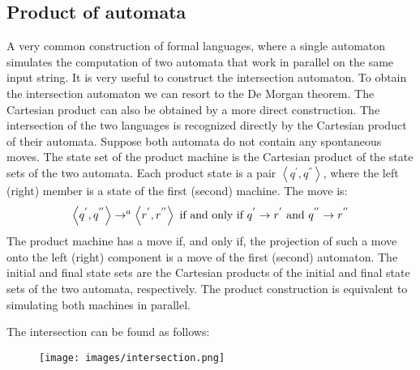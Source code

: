 \subsection*{Product of automata}
A very common construction of formal languages, where a single automaton simulates the computation of two automata that work in parallel on the same input string. 
It is very useful to construct the intersection automaton. To obtain the intersection automaton we can resort to the De Morgan theorem. The Cartesian product can 
also be obtained by a more direct construction. The intersection of the two languages is recognized directly by the Cartesian product of their automata. 
Suppose both automata do not contain any spontaneous moves. The state set of the product machine is the Cartesian product of the state sets
of the two automata. Each product state is a pair $\left\langle q^{'},q^{''} \right\rangle $, where the left (right) member is a state of the first (second) machine. 
The move is: 
\[\left\langle q^{'},q^{''} \right\rangle \rightarrow^a \left\langle r^{'},r^{''} \right\rangle \textnormal{ if and only if } q^{'} \rightarrow r^{'} \textnormal{ and } q^{''} \rightarrow r^{''}\]
The product machine has a move if, and only if, the projection of such a move onto the left (right) component is a move of the first (second) automaton. The initial 
and final state sets are the Cartesian products of the initial and final state sets of the two automata, respectively. The product construction is equivalent to simulating both 
machines in parallel.
\begin{example}
    The intersection can be found as follows: 
    \begin{figure}[H]
        \centering
        \texttt{[image: images/intersection.png]}
    \end{figure}
\end{example}